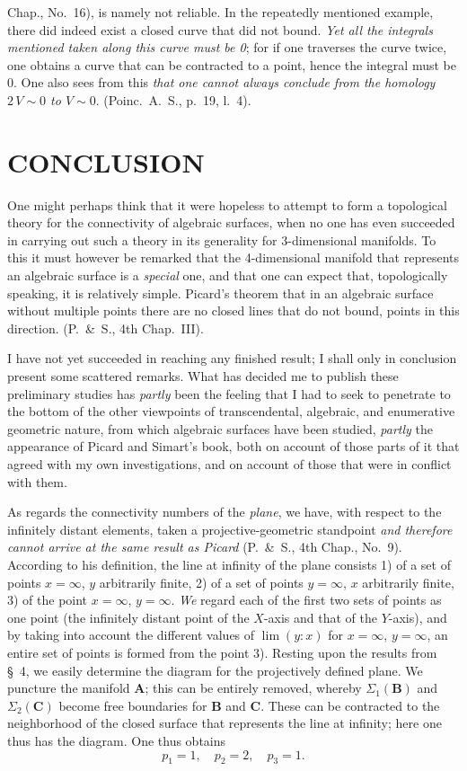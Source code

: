 \documentclass{article}
\begin{document}
Chap., No.\ 16), is namely not reliable. In the repeatedly mentioned example, there did indeed exist a closed curve that did not bound. \emph{Yet all the integrals mentioned taken along this curve must be 0}; for if one traverses the curve twice, one obtains a curve that can be contracted to a point, hence the integral must be 0. One also sees from this \emph{that one cannot always conclude from the homology $2\,V \sim 0$ to $V \sim 0$}. (Poinc.\ A.\ S., p.\ 19, l.\ 4).

\section*{CONCLUSION}

One might perhaps think that it were hopeless to attempt to form a topological theory for the connectivity of algebraic surfaces, when no one has even succeeded in carrying out such a theory in its generality for 3-dimensional manifolds. To this it must however be remarked that the 4-dimensional manifold that represents an algebraic surface is a \emph{special} one, and that one can expect that, topologically speaking, it is relatively simple. Picard's theorem that in an algebraic surface without multiple points there are no closed lines that do not bound, points in this direction. (P.~\&~S., 4th Chap.\ III).

I have not yet succeeded in reaching any finished result; I shall only in conclusion present some scattered remarks. What has decided me to publish these preliminary studies has \emph{partly} been the feeling that I had to seek to penetrate to the bottom of the other viewpoints of transcendental, algebraic, and enumerative geometric nature, from which algebraic surfaces have been studied, \emph{partly} the appearance of Picard and Simart's book, both on account of those parts of it that agreed with my own investigations, and on account of those that were in conflict with them.

As regards the connectivity numbers of the \emph{plane}, we have, with respect to the infinitely distant elements, taken a projective-geometric standpoint \emph{and therefore cannot arrive at the same result as Picard} (P.~\&~S., 4th Chap., No.~9). According to his definition, the line at infinity of the plane consists 1) of a set of points $x = \infty$, $y$ arbitrarily finite, 2) of a set of points $y = \infty$, $x$ arbitrarily finite, 3) of the point $x = \infty$, $y = \infty$. \emph{We} regard each of the first two sets of points as one point (the infinitely distant point of the $X$-axis and that of the $Y$-axis), and by taking into account the different values of $\lim(y:x)$ for $x = \infty$, $y = \infty$, an entire set of points is formed from the point 3). Resting upon the results from \S~4, we easily determine the diagram for the projectively defined plane. We puncture the manifold $\mathbf{A}$; this can be entirely removed, whereby $\Sigma_1(\mathbf{B})$ and $\Sigma_2(\mathbf{C})$ become free boundaries for $\mathbf{B}$ and $\mathbf{C}$. These can be contracted to the neighborhood of the closed surface that represents the line at infinity; here one thus has the diagram. One thus obtains
\[
p_1 = 1, \quad p_2 = 2, \quad p_3 = 1.
\]
\end{document}
